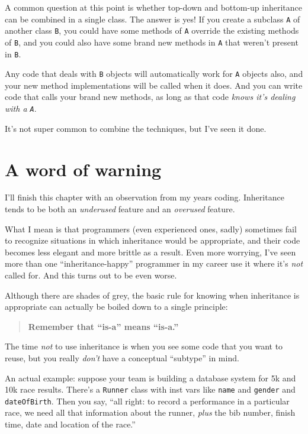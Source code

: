 A common question at this point is whether top-down and bottom-up inheritance
can be combined in a single class. The answer is yes! If you create a
subclass \texttt{A} of another class \texttt{B}, you could have some methods
of \texttt{A} override the existing methods of \texttt{B}, and you could also
have some brand new methods in \texttt{A} that weren't present in \texttt{B}.

Any code that deals with \texttt{B} objects will automatically work for
\texttt{A} objects also, and your new method implementations will be called
when it does. And you can write code that calls your brand new methods, as
long as that code \textit{knows it's dealing with a \texttt{A}}.

It's not super common to combine the techniques, but I've seen it done.

\section{A word of warning}

I'll finish this chapter with an observation from my years coding. Inheritance
tends to be both an \textit{underused} feature and an \textit{overused}
feature.

What I mean is that programmers (even experienced ones, sadly) sometimes fail
to recognize situations in which inheritance would be appropriate, and their
code becomes less elegant and more brittle as a result. Even more worrying,
I've seen more than one ``inheritance-happy'' programmer in my career use it
where it's \textit{not} called for. And this turns out to be even worse.

Although there are shades of grey, the basic rule for knowing when inheritance
is appropriate can actually be boiled down to a single principle:

\begin{quote}
\textbf{Remember that ``is-a'' means ``is-a.''}
\end{quote}

The time \textit{not} to use
inheritance is when you see some code that you want to reuse, but you really
\textit{don't} have a conceptual ``subtype'' in mind.

An actual example: suppose your team is building a database system for 5k and
10k race results. There's a \texttt{Runner} class with inst vars like
\texttt{name} and \texttt{gender} and \texttt{dateOfBirth}. Then you say,
``all right: to record a performance in a particular race, we need all that
information about the runner, \textit{plus} the bib number, finish time, date
and location of the race.''

